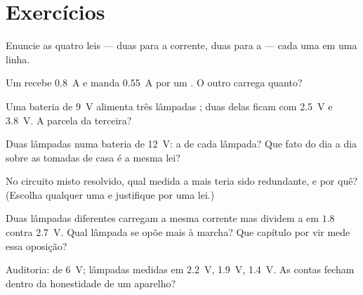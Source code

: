 \section{Exercícios}

\begin{exercise}[$\star$]\label{exo:g8:circuit-laws:1}
Enuncie as quatro leis --- duas para a corrente, duas para a 
--- cada uma em uma linha.
\end{exercise}

\begin{exercise}[$\star$]\label{exo:g8:circuit-laws:2}
Um  recebe \qty{0.8}{A} e manda \qty{0.55}{A} por um . O outro
 carrega quanto?
\end{exercise}

\begin{exercise}[$\star$]\label{exo:g8:circuit-laws:3}
Uma bateria de \qty{9}{V} alimenta três lâmpadas ; duas delas
ficam com \qty{2.5}{V} e \qty{3.8}{V}. A parcela da terceira?
\end{exercise}

\begin{exercise}[$\star$]\label{exo:g8:circuit-laws:4}
Duas lâmpadas  numa bateria de \qty{12}{V}: a  de
cada lâmpada? Que fato do dia a dia sobre as tomadas de casa é a
mesma lei?
\end{exercise}

\begin{exercise}[$\star$]\label{exo:g8:circuit-laws:5}
No circuito misto resolvido, qual medida a mais teria sido
redundante, e por quê? (Escolha qualquer uma e justifique por uma
lei.)
\end{exercise}

\begin{exercise}[$\star$]\label{exo:g8:circuit-laws:6}
Duas lâmpadas diferentes  carregam a mesma corrente mas
dividem a  em $1.8$ contra \qty{2.7}{V}. Qual lâmpada se opõe
mais à marcha? Que capítulo por vir mede essa oposição?
\end{exercise}

\begin{exercise}[$\star$]\label{exo:g8:circuit-laws:7}
Auditoria:  de \qty{6}{V}; lâmpadas  medidas em
\qty{2.2}{V}, \qty{1.9}{V}, \qty{1.4}{V}. As contas fecham dentro da
honestidade de um aparelho?
\end{exercise}

